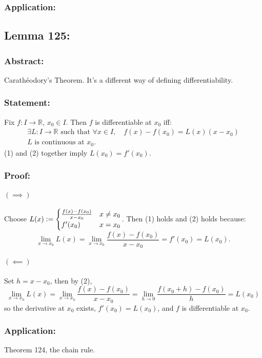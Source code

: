\documentclass{article}
\begin{document}
\subsubsection*{Application:}

\subsection{Lemma 125:}
\subsubsection*{Abstract:}
Carathéodory’s Theorem. It's a different way of defining
differentiability.
\subsubsection*{Statement:}
Fix $f:I \to \mathbb{R}$, $x_0 \in I$. Then $f$
is differentiable at $x_0$ iff:
\begin{gather}
\exists L:I \to
\mathbb{R} \text{ such that } \forall x \in I, \quad  f(x)-f(x_0) = L(x)(x-x_0) \\
L \text{ is continuous at } x_0.
\end{gather}
(1) and (2) together imply $L(x_0) = f'(x_0)$.
\subsubsection*{Proof:}
\paragraph{$(\implies)$}
Choose $L(x) \vcentcolon=
\begin{cases}
      \frac{f(x)-f(x_0)}{x-x_0} & x \neq x_0 \\
      f'(x_0) & x = x_0
\end{cases}$. Then (1) holds and (2) holds because: \[
\lim_{x \to x_0} L(x) = \lim_{x \to x_0} \frac{f(x)-f(x_0)}{x-x_0} = f'(x_0) = L(x_0). \]
\paragraph{$(\impliedby)$}
Set $h=x-x_0$, then by (2),
\[
\lim_{x \to x_0}L(x) = \lim_{x \to x_0}\frac{f(x)-f(x_0)}{x-x_0} = \lim_{h \to 0}\frac{f(x_0+h)-f(x_0)}{h} = L(x_0)
\]
so the derivative at $x_0$ exists, $f'(x_0) = L(x_0)$, and $f$ is differentiable at $x_0$.
\subsubsection*{Application:}
Theorem 124, the chain rule.
\end{document}
